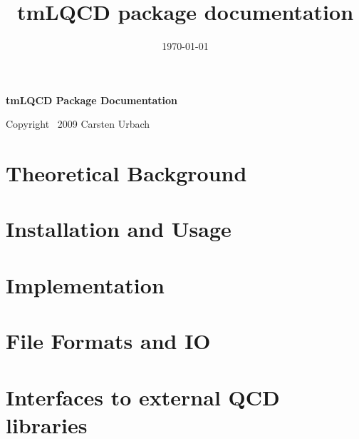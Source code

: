 \documentclass[a4paper,12pt]{article}
\date{\today}
\title{tmLQCD package documentation}
\begin{document}
\begin{center}
  {\Large\bf tmLQCD Package Documentation}\\
\end{center}

\tableofcontents

\begin{flushright}
  Copyright \textcopyright\ 2009 Carsten Urbach
\end{flushright}

\section{Theoretical Background}


\section{Installation and Usage}


\section{Implementation}




\section{File Formats and IO}

\section{Interfaces to external QCD libraries}

\clearpage


\clearpage
\end{document}
